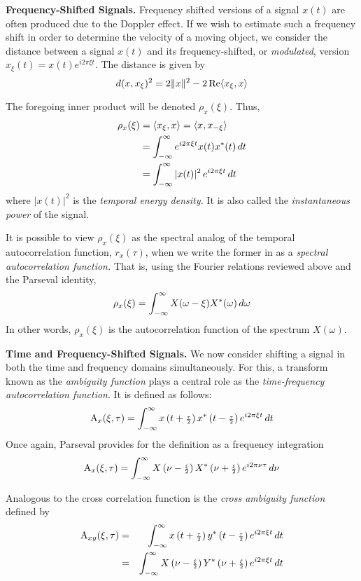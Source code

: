\begin{define}{\bf Frequency-Shifted Signals. }  Frequency shifted
versions of a signal $x(t)$ are often produced due to the Doppler
effect.  If we wish to estimate such a frequency shift in order to
determine the velocity of a  moving object, we consider the distance
between a signal $x(t)$ and its frequency-shifted, or
\emph{modulated}, version $x_\xi(t) = x(t)e^{i2\pi\xi t}$. 
The distance is given by
\[
d(x, x_\xi)^2 = 2\|x\|^2 - 2 \,\mbox{Re}\langle x_\xi,x\rangle
\] 
\end{define}
The foregoing inner product will be denoted $\rho_{x}(\xi)$.  Thus,
\begin{align*}
\rho_{x}(\xi)&= \langle x_\xi,x \rangle 
              = \langle x,x_{-\xi}\rangle\\
             &= \int_{-\infty}^{\infty} e^{i2\pi\xi t} x(t)x^*(t)\,dt\\
             &= \int_{-\infty}^{\infty} |x(t)|^2 \,e^{i2\pi\xi t}\,dt 
\end{align*}
where $|x(t)|^2$ is the \emph{temporal energy density.}  It is also
called the \emph{instantaneous power} of the signal.

It is possible to view $\rho_{x}(\xi)$ as the spectral analog of the
temporal autocorrelation function, $r_{x}(\tau)$, when we write the
former in as a \emph{spectral autocorrelation function.}  That is,
using the Fourier relations reviewed above and the Parseval identity,
\[
\rho_{x}(\xi) = \int_{-\infty}^{\infty} X(\omega - \xi)X^*(\omega)\,d\omega
\]
In other words, $\rho_{x}(\xi)$ is the autocorrelation function of the
spectrum $X(\omega)$.

\begin{define}{\bf Time and Frequency-Shifted Signals. }  
We now consider shifting a signal in both the time and frequency domains
simultaneously.  For this, a transform known as the 
\emph{ambiguity function} plays a central role as the 
\emph{time-frequency autocorrelation function}.  
It is defined as follows: 
\[
\operatorname{A}_{x}(\xi,\tau) = \int_{-\infty}^{\infty} x\left(t+{\scriptstyle \frac{\tau}{2}}\right) x^*\left(t-{\scriptstyle \frac{\tau}{2}}\right) e^{i2\pi \xi t}\,dt
\]
Once again, Parseval provides for the definition as a frequency
integration
\[
\operatorname{A}_{x}(\xi,\tau) = \int_{-\infty}^{\infty} X\left(\nu-{\scriptstyle \frac{\xi}{2}}\right) X^*\left(\nu+{\scriptstyle \frac{\xi}{2}}\right) e^{i2\pi \nu \tau}\,d\nu
\]
\end{define}
Analogous to the cross correlation function is the
\emph{cross ambiguity function} defined by 
\begin{eqnarray}
\label{eqn:crossAmbiguity}
  \operatorname{A}_{xy}(\xi,\tau) 
   &=& \int_{-\infty}^{\infty} x\left(t+{\scriptstyle \frac{\tau}{2}}\right) y^*\left(t-{\scriptstyle \frac{\tau}{2}}\right) e^{i2\pi \xi t}\,dt\\
   &=& \int_{-\infty}^{\infty} X\left(\nu-{\scriptstyle \frac{\xi}{2}}\right) Y^*\left(\nu+{\scriptstyle \frac{\xi}{2}}\right) e^{i2\pi \xi t}\,dt\nonumber \\
\end{eqnarray}


